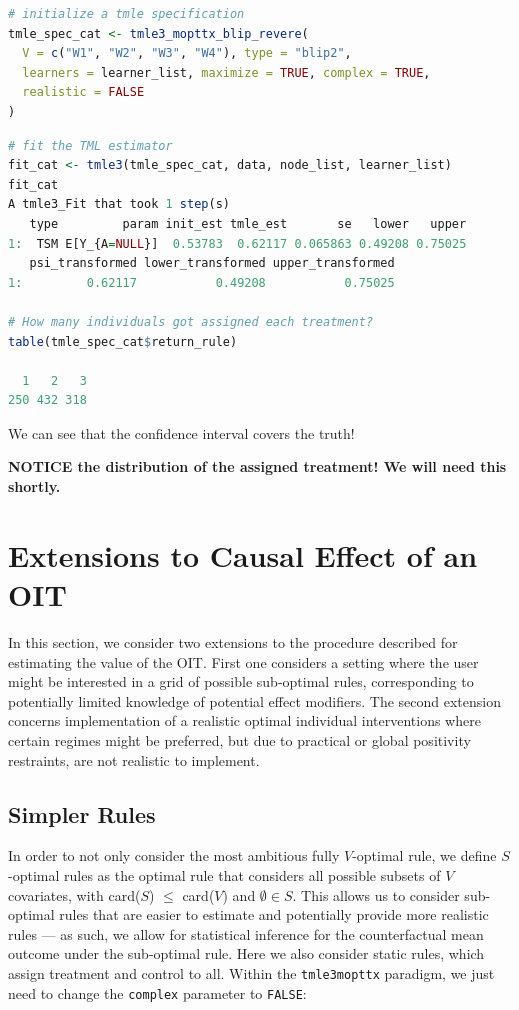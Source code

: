 \documentclass[
  12pt, krantz2,
]{krantz}
\newcommand{\passthrough}[1]{#1}
\theoremstyle{definition}
\theoremstyle{definition}
\theoremstyle{definition}
\newcommand{\1}{\mathbbm{1}}
\begin{document}
\begin{lstlisting}[language=R]
# initialize a tmle specification
tmle_spec_cat <- tmle3_mopttx_blip_revere(
  V = c("W1", "W2", "W3", "W4"), type = "blip2",
  learners = learner_list, maximize = TRUE, complex = TRUE,
  realistic = FALSE
)
\end{lstlisting}

\begin{lstlisting}[language=R]
# fit the TML estimator
fit_cat <- tmle3(tmle_spec_cat, data, node_list, learner_list)
fit_cat
A tmle3_Fit that took 1 step(s)
   type         param init_est tmle_est       se   lower   upper
1:  TSM E[Y_{A=NULL}]  0.53783  0.62117 0.065863 0.49208 0.75025
   psi_transformed lower_transformed upper_transformed
1:         0.62117           0.49208           0.75025

# How many individuals got assigned each treatment?
table(tmle_spec_cat$return_rule)

  1   2   3 
250 432 318 
\end{lstlisting}

We can see that the confidence interval covers the truth!

\textbf{NOTICE the distribution of the assigned treatment! We will need this shortly.}

\hypertarget{extensions-to-causal-effect-of-an-oit}{%
\section{Extensions to Causal Effect of an OIT}\label{extensions-to-causal-effect-of-an-oit}}

In this section, we consider two extensions to the procedure described for
estimating the value of the OIT. First one considers a setting where the user
might be interested in a grid of possible sub-optimal rules, corresponding to
potentially limited knowledge of potential effect modifiers. The second
extension concerns implementation of a realistic optimal individual
interventions where certain regimes might be preferred, but due to practical or
global positivity restraints, are not realistic to implement.

\hypertarget{oit-eval-cat-v2}{%
\subsection{Simpler Rules}\label{oit-eval-cat-v2}}

In order to not only consider the most ambitious fully \(V\)-optimal rule, we
define \(S\)-optimal rules as the optimal rule that considers all possible subsets
of \(V\) covariates, with card(\(S\)) \(\leq\) card(\(V\)) and \(\emptyset \in S\). This
allows us to consider sub-optimal rules that are easier to estimate and
potentially provide more realistic rules --- as such, we allow for statistical
inference for the counterfactual mean outcome under the sub-optimal rule.
Here we also consider static rules, which assign treatment and control to all.
Within the \passthrough{\lstinline!tmle3mopttx!} paradigm, we just need to change the \passthrough{\lstinline!complex!}
parameter to \passthrough{\lstinline!FALSE!}:
\end{document}

